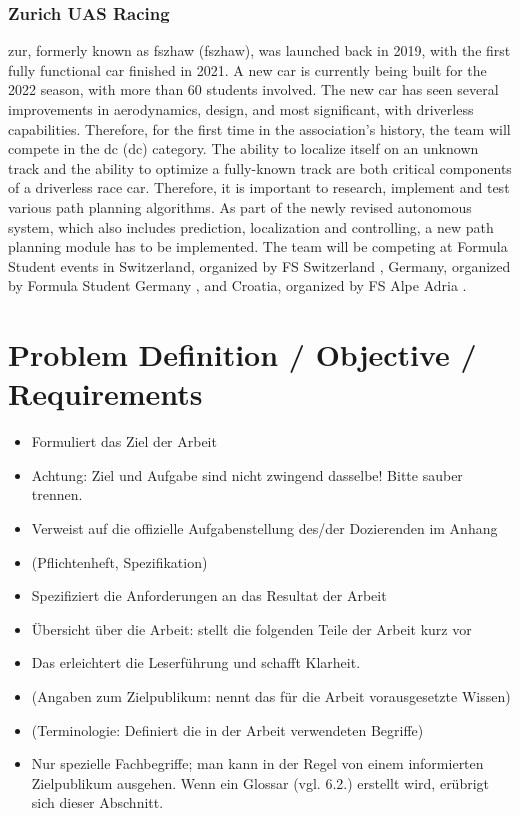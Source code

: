 \subsubsection{Zurich UAS Racing}
\acrlong{zur}, formerly known as \acrlong{fszhaw} (\acrshort{fszhaw}), was launched back in 2019, with the first fully functional car finished in 2021. A new car is currently being built for the 2022 season, with more than 60 students involved. The new car has seen several improvements in aerodynamics, design, and most significant, with driverless capabilities. \cite{fszhaw_launch}
Therefore, for the first time in the association's history, the team will compete in the \acrlong{dc} (\acrshort{dc}) category.
The ability to localize itself on an unknown track and the ability to optimize a fully-known track are both critical components of a driverless race car. Therefore, it is important to research, implement and test various path planning algorithms. As part of the newly revised autonomous system, which also includes prediction, localization and controlling, a new path planning module has to be implemented.
The team will be competing at Formula Student events in Switzerland, organized by FS Switzerland \cite{fsswitzerland}, Germany, organized by Formula Student Germany \cite{fs_germany}, and Croatia, organized by FS Alpe Adria \cite{fs_alpe_adria}.

\section{Problem Definition / Objective / Requirements}
\begin{itemize}
    \item Formuliert das Ziel der Arbeit
    \item Achtung: Ziel und Aufgabe sind nicht zwingend dasselbe! Bitte sauber trennen.
    \item Verweist auf die offizielle Aufgabenstellung des/der Dozierenden im Anhang
    \item (Pflichtenheft, Spezifikation)
    \item Spezifiziert die Anforderungen an das Resultat der Arbeit
    \item Übersicht über die Arbeit: stellt die folgenden Teile der Arbeit kurz vor
    \item Das erleichtert die Leserführung und schafft Klarheit.
    \item (Angaben zum Zielpublikum: nennt das für die Arbeit vorausgesetzte Wissen)
    \item (Terminologie: Definiert die in der Arbeit verwendeten Begriffe)
    \item Nur spezielle Fachbegriffe; man kann in der Regel von einem informierten Zielpublikum ausgehen.
    Wenn ein Glossar (vgl. 6.2.) erstellt wird, erübrigt sich dieser Abschnitt.
\end{itemize}
